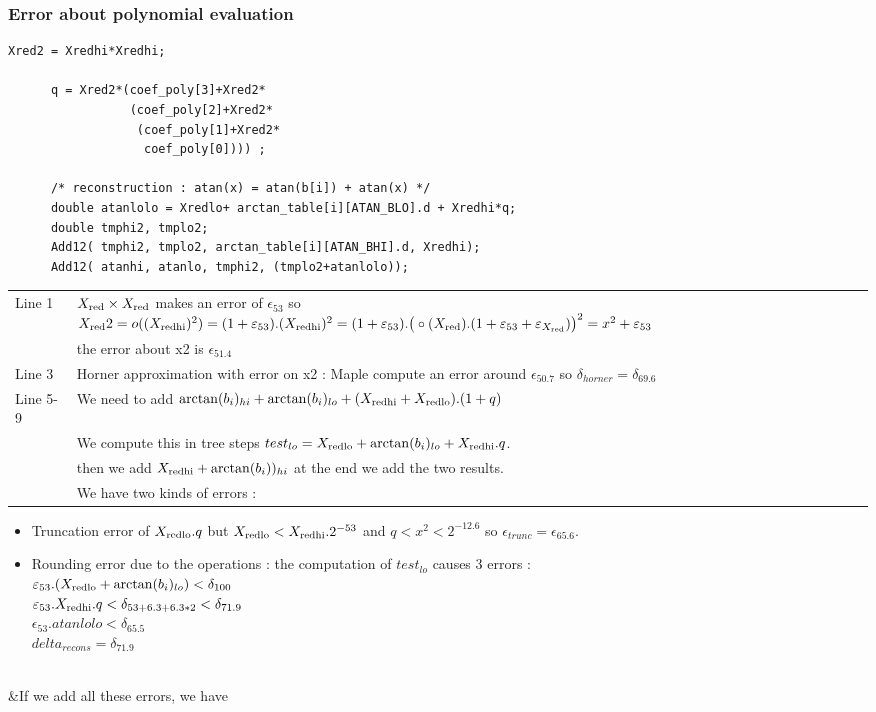 \subsubsection{Error about polynomial evaluation}
\begin{lstlisting}[caption={Polynomial Evaluation},firstnumber=1]
      Xred2 = Xredhi*Xredhi;
      
      q = Xred2*(coef_poly[3]+Xred2*
                 (coef_poly[2]+Xred2*
                  (coef_poly[1]+Xred2*
                   coef_poly[0]))) ;

      /* reconstruction : atan(x) = atan(b[i]) + atan(x) */
      double atanlolo = Xredlo+ arctan_table[i][ATAN_BLO].d + Xredhi*q;
      double tmphi2, tmplo2;
      Add12( tmphi2, tmplo2, arctan_table[i][ATAN_BHI].d, Xredhi);
      Add12( atanhi, atanlo, tmphi2, (tmplo2+atanlolo));

\end{lstlisting}
\begin{tabular}{ll}
Line 1 & $X_{\mathrm{red}} \times X_{\mathrm{red}}$ makes an error of $\epsilon_{53}$ so $X_{\mathrm{red}}2 =
      o((X_{\mathrm{red hi}})^2) = (1+\varepsilon_{53}). (X_{\mathrm{red hi}})^2 = ( 1 + \varepsilon_{53}).\big(\circ(X_{\mathrm{red}}).(1+\varepsilon_{53}+\varepsilon_{X_{\mathrm{red}}})\big)^2 = x^2 +  \varepsilon_{53} $\\ 
      &the error about x2 is $\epsilon_{51.4}$ \\
Line 3 & Horner approximation with error on x2 :
      Maple compute an error around $\epsilon_{50.7}$ so $\delta_{horner}=\delta_{69.6}$\\ 
Line 5-9 & We need to add $\arctan(b_i)_{hi}+\arctan(b_i)_{lo} +
      (X_{\mathrm{red hi}}+X_{\mathrm{red lo}}).(1+q)$\\
      &
      We compute this in tree steps $test_{lo}= X_{\mathrm{red lo}}+ \arctan(b_i)_{lo}
      + X_{\mathrm{red hi}}.q$.\\
      & then we add $X_{\mathrm{red hi}}+\arctan(b_i))_{hi}$ at the end we add the two results.\\

      &We have two kinds of errors : 
\end{tabular}      
  \begin{itemize} 
    \item Truncation error of  $X_{\mathrm{red lo}}.q$
      but $X_{\mathrm{red lo}} < X_{\mathrm{red hi}}.2^{-53}$ and $q<x^2<2^{-12.6}$ so $\epsilon_{trunc} =
      \epsilon_{65.6}$. 
    \item Rounding error due to the operations : the computation of
      $test_{lo}$ causes 3 errors :\\
       $ \varepsilon_{53}.(X_{\mathrm{red lo}}+ \arctan(b_i)_{lo}) < \delta_{100}$\\
       $\varepsilon_{53}.X_{\mathrm{red hi}}.q < \delta_{53+6.3+6.3*2} < \delta_{71.9}$\\
       $ \epsilon_{53} . atanlolo < \delta_{65.5}$\\
       $delta_{recons} =  \delta_{71.9}$
      \end{itemize}\\
      &If we add all these errors, we have 

